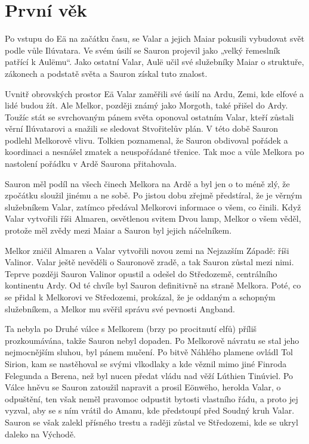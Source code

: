\documentclass[12pt]{report}
\begin{document}
\section{První věk}
Po vstupu do Eä na začátku času, se Valar a jejich Maiar pokusili vybudovat svět podle vůle Ilúvatara. Ve svém úsilí se Sauron projevil jako „velký řemeslník patřící k Aulëmu“. Jako ostatní Valar, Aulë učil své služebníky Maiar o struktuře, zákonech a podstatě světa a Sauron získal tuto znalost.

Uvnitř obrovských prostor Eä Valar zaměřili své úsilí na Ardu, Zemi, kde elfové a lidé budou žít. Ale Melkor, později známý jako Morgoth, také přišel do Ardy. Toužíc stát se svrchovaným pánem světa oponoval ostatním Valar, kteří zůstali věrní Ilúvatarovi a snažili se sledovat Stvořitelův plán. V této době Sauron podlehl Melkorově vlivu. Tolkien poznamenal, že Sauron obdivoval pořádek a koordinaci a nesnášel zmatek a neuspořádané třenice. Tak moc a vůle Melkora po nastolení pořádku v Ardě Saurona přitahovala.

Sauron měl podíl na všech činech Melkora na Ardě a byl jen o to méně zlý, že zpočátku sloužil jinému a ne sobě. Po jistou dobu zřejmě předstíral, že je věrným služebníkem Valar, zatímco předával Melkorovi informace o všem, co činili. Když Valar vytvořili říši Almaren, osvětlenou svitem Dvou lamp, Melkor o všem věděl, protože měl zvědy mezi Maiar a Sauron byl jejich náčelníkem.

Melkor zničil Almaren a Valar vytvořili novou zemi na Nejzazším Západě: říši Valinor. Valar ještě nevěděli o Sauronově zradě, a tak Sauron zůstal mezi nimi. Teprve později Sauron Valinor opustil a odešel do Středozemě, centrálního kontinentu Ardy. Od té chvíle byl Sauron definitivně na straně Melkora. Poté, co se přidal k Melkorovi ve Středozemi, prokázal, že je oddaným a schopným služebníkem, a Melkor mu svěřil správu své pevnosti Angband.

Ta nebyla po Druhé válce s Melkorem (brzy po procitnutí elfů) příliš prozkoumávána, takže Sauron nebyl dopaden. Po Melkorově návratu se stal jeho nejmocnějším sluhou, byl pánem mučení. Po bitvě Náhlého plamene ovládl Tol Sirion, kam se nastěhoval se svými vlkodlaky a kde věznil mimo jiné Finroda Felegunda a Berena, než byl nucen předat vládu nad věží Lúthien Tinúviel. Po Válce hněvu se Sauron zatoužil napravit a prosil Eönwëho, herolda Valar, o odpuštění, ten však neměl pravomoc odpustit bytosti vlastního řádu, a proto jej vyzval, aby se s ním vrátil do Amanu, kde předstoupí před Soudný kruh Valar. Sauron se však zalekl přísného trestu a raději zůstal ve Středozemi, kde se ukryl daleko na Východě. 
\end{document}
